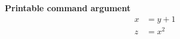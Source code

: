 \documentclass{article}
\begin{document}
\textbf{Printable command argument}
\begin{align}
  x &= y + 1 \\
  z &= x^2
\end{align}
\end{document}
